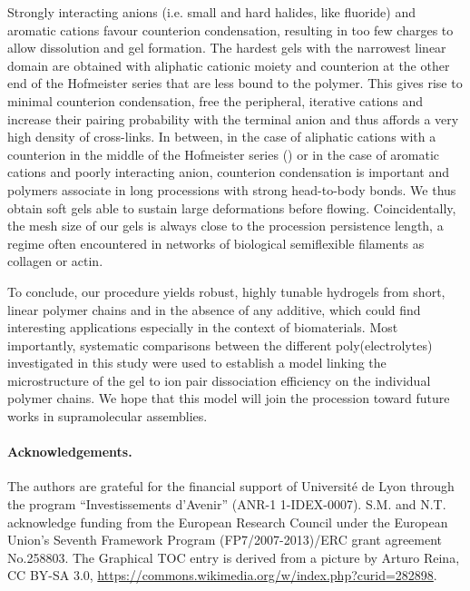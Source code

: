 \documentclass[twoside,twocolumn,9pt]{article}
\begin{document}
Strongly interacting anions (i.e. small and hard halides, like fluoride) and aromatic cations favour counterion condensation, resulting in too few charges to allow dissolution and gel formation. The hardest gels with the narrowest linear domain are obtained with aliphatic cationic moiety and counterion at the other end of the Hofmeister series that are less bound to the polymer. This gives rise to minimal counterion condensation, free the peripheral, iterative cations and increase their pairing probability with the terminal anion and thus affords a very high density of cross-links. In between, in the case of aliphatic cations with a counterion in the middle of the Hofmeister series () or in the case of aromatic cations and poorly interacting anion, counterion condensation is important and polymers associate in long processions with strong head-to-body bonds. We thus obtain soft gels able to sustain large deformations before flowing. Coincidentally, the mesh size of our gels is always close to the procession persistence length, a regime often encountered in networks of biological semiflexible filaments as collagen or actin\cite{Meng2016}.

To conclude, our procedure yields robust, highly tunable hydrogels from short, linear polymer chains and in the absence of any additive, which could find interesting applications especially in the context of biomaterials. Most importantly, systematic comparisons between the different poly(electrolytes) investigated in this study were used to establish a model linking the microstructure of the gel to ion pair dissociation efficiency on the individual polymer chains. We hope that this model will join the procession toward future works in supramolecular assemblies.

\paragraph*{Acknowledgements.}
The authors are grateful for the financial support of Universit\'{e} de Lyon through the program ``Investissements d'Avenir'' (ANR-1 1-IDEX-0007). S.M. and N.T. acknowledge funding from the European Research Council under the European Union's Seventh Framework Program (FP7/2007-2013)/ERC grant agreement No.258803. The Graphical TOC entry is derived from a picture by Arturo Reina, CC BY-SA 3.0, \url{https://commons.wikimedia.org/w/index.php?curid=282898}.


\end{document}
